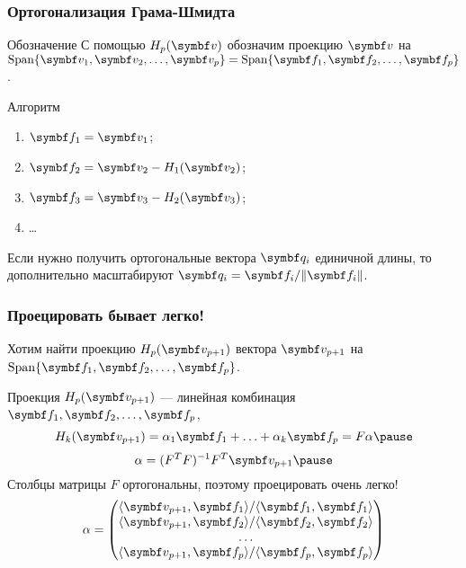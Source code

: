 \begin{frame}
    \frametitle{Ортогонализация Грама-Шмидта}
    
    \begin{block}{Обозначение}
        С помощью $H_p(\bv)$ обозначим проекцию $\bv$ на $\Span \{ \bv_1, \bv_2, \ldots, \bv_p \} = \Span \{ \bff_1, \bff_2, \ldots, \bff_p \}$. \pause
    \end{block}

    \begin{block}{Алгоритм}
        \begin{enumerate}
            \item $\bff_1 = \bv_1$; \pause
            \item $\bff_2 = \bv_2 - H_1(\bv_2)$; \pause
            \item $\bff_3 = \bv_3 - H_2(\bv_3)$; \pause
            \item \ldots
        \end{enumerate}        \pause
    \end{block}

    Если нужно получить ортогональные вектора $\bq_i$ единичной длины, то дополнительно масштабируют
    $\bq_i = \bff_i / \norm{\bff_i}$.
    
\end{frame}


\begin{frame}
    \frametitle{Проецировать бывает легко!}
    Хотим найти проекцию $H_p(\bv_{p+1})$ вектора  $\bv_{p+1}$ на $\Span\{ \bff_1, \bff_2, \ldots, \bff_p \}$. 

    Проекция $H_p(\bv_{p+1})$ — линейная комбинация $\bff_1, \bff_2, \ldots, \bff_p$,
    \[
        H_k(\bv_{p+1}) = \alpha_1 \bff_1 + \ldots + \alpha_k \bff_p = F \alpha    \pause
    \]
    \[
    \alpha = (F^TF)^{-1} F^T \bv_{p+1} \pause    
    \]
    Столбцы матрицы $F$ ортогональны, поэтому проецировать очень легко!
    \[
    \alpha = \begin{pmatrix}
        \langle \bv_{p+1}, \bff_1 \rangle / \langle \bff_1, \bff_1 \rangle \\
        \langle \bv_{p+1}, \bff_2 \rangle / \langle \bff_2, \bff_2 \rangle \\
        \ldots \\
\langle \bv_{p+1}, \bff_p \rangle / \langle \bff_p, \bff_p \rangle \\
    \end{pmatrix}    
    \]

\end{frame}


